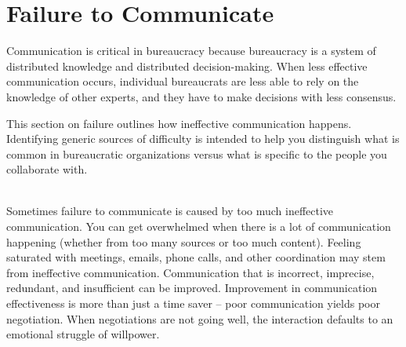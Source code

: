 \section{Failure to Communicate\label{sec:failure-to-comm}}

Communication is critical in bureaucracy because bureaucracy is a system of distributed knowledge and distributed decision-making. When less effective communication occurs, individual bureaucrats are less able to rely on the knowledge of other experts, and they have to make decisions with less consensus. 

This section on failure outlines how ineffective communication happens. Identifying generic sources of difficulty is intended to help you distinguish what is common in bureaucratic organizations versus what is specific to the people you collaborate with. 


\ \\

Sometimes failure to communicate is caused by too much ineffective communication. 
You can get overwhelmed when there is a lot of communication happening (whether from too many sources or too much content).
Feeling saturated with meetings, emails, phone calls, and other coordination may stem from ineffective communication. 
Communication that is incorrect, imprecise, redundant, and insufficient can be improved. 
Improvement in communication effectiveness is more than just a time saver --
poor communication yields poor negotiation. When negotiations are not going well,  the interaction defaults to an emotional struggle of willpower. 



